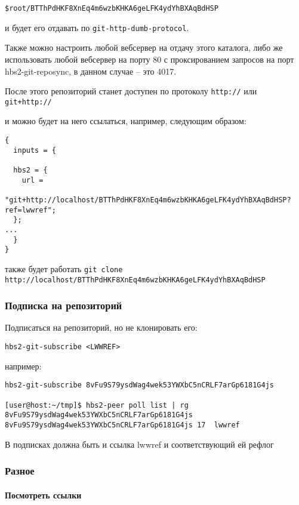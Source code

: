 \documentclass[11pt,a4paper]{article}
\begin{document}
\texttt{\$root/BTThPdHKF8XnEq4m6wzbKHKA6geLFK4ydYhBXAqBdHSP}

и будет его отдавать по \texttt{git-http-dumb-protocol}.

Также можно настроить любой вебсервер на отдачу этого каталога, либо же
использовать любой вебсервер на порту 80 с проксированием запросов на порт hbs2-git-reposync,
в данном случае -- это 4017.

После этого репозиторий станет доступен по протоколу \texttt{http://} или \texttt{git+http://}

и можно будет на него ссылаться, например, следующим образом:

\begin{verbatim}
{
  inputs = {

  hbs2 = {
    url =
      "git+http://localhost/BTThPdHKF8XnEq4m6wzbKHKA6geLFK4ydYhBXAqBdHSP?ref=lwwref";
  };
...
  }
}
\end{verbatim}

также будет работать \texttt{git clone http://localhost/BTThPdHKF8XnEq4m6wzbKHKA6geLFK4ydYhBXAqBdHSP}

\subsubsection{Подписка на репозиторий}

Подписаться на репозиторий, но не клонировать его:

\begin{verbatim}
hbs2-git-subscribe <LWWREF>
\end{verbatim}

например:

\begin{verbatim}
hbs2-git-subscribe 8vFu9S79ysdWag4wek53YWXbC5nCRLF7arGp6181G4js

[user@host:~/tmp]$ hbs2-peer poll list | rg  8vFu9S79ysdWag4wek53YWXbC5nCRLF7arGp6181G4js
8vFu9S79ysdWag4wek53YWXbC5nCRLF7arGp6181G4js 17  lwwref
\end{verbatim}

В подписках должна быть и ссылка lwwref и соответствующий ей рефлог

\subsubsection{Разное}

\paragraph{Посмотреть ссылки}
\end{document}
